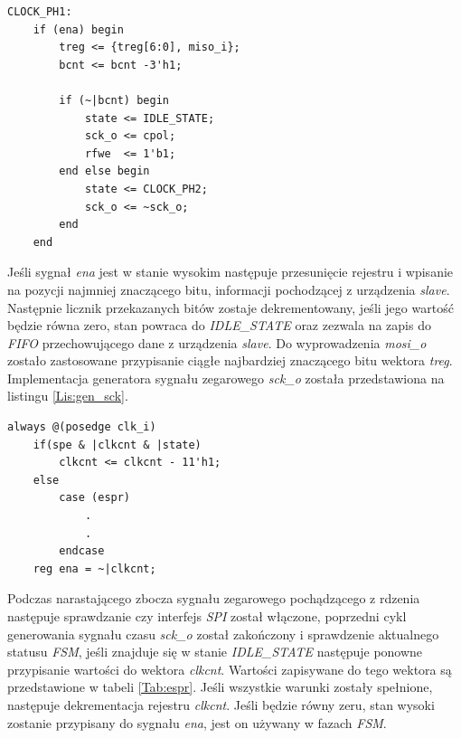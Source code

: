 \documentclass[11pt,a4paper]{article}
\begin{document}
 			 \begin{minipage}{\textwidth}
\begin{scriptsize}
\begin{lstlisting}[label=Lis:spi_clock1,caption=Faza \textit{CLOCK\_PH1}]
CLOCK_PH1:
	if (ena) begin
		treg <= {treg[6:0], miso_i};
		bcnt <= bcnt -3'h1;

		if (~|bcnt) begin
			state <= IDLE_STATE;
			sck_o <= cpol;
			rfwe  <= 1'b1;
		end else begin
			state <= CLOCK_PH2;
			sck_o <= ~sck_o;
		end
	end
\end{lstlisting}
\end{scriptsize}
\end{minipage}
Jeśli sygnał \textit{ena} jest w stanie wysokim następuje przesunięcie rejestru i wpisanie na pozycji najmniej znaczącego bitu, informacji pochodzącej z urządzenia \textit{slave}. Następnie licznik przekazanych bitów zostaje dekrementowany, jeśli jego wartość będzie równa zero, stan powraca do \textit{IDLE\_STATE} oraz zezwala na zapis do \textit{FIFO} przechowującego dane z urządzenia \textit{slave}. Do wyprowadzenia \textit{mosi\_o} zostało zastosowane przypisanie ciągłe najbardziej znaczącego bitu wektora \textit{treg}.\\
Implementacja generatora sygnału zegarowego \textit{sck\_o} została przedstawiona na listingu \ref{Lis:gen_sck}.\\
 			 \begin{minipage}{\textwidth}
\begin{scriptsize}
\begin{lstlisting}[label=Lis:gen_sck,caption=Generowanie sygnału zegarowego]
always @(posedge clk_i)
	if(spe & |clkcnt & |state)
		clkcnt <= clkcnt - 11'h1;
	else
		case (espr) 
			.
			.
		endcase
	reg ena = ~|clkcnt;
\end{lstlisting}
\end{scriptsize}
\end{minipage}
Podczas narastającego zbocza sygnału zegarowego pochądzącego z rdzenia następuje sprawdzanie czy interfejs \textit{SPI} został włączone, poprzedni cykl generowania sygnału czasu \textit{sck\_o} został zakończony i sprawdzenie aktualnego statusu \textit{FSM}, jeśli znajduje się w stanie \textit{IDLE\_STATE} następuje ponowne przypisanie wartości do wektora \textit{clkcnt}. Wartości zapisywane do tego wektora są przedstawione w tabeli \ref{Tab:espr}. Jeśli wszystkie warunki zostały spełnione, następuje dekrementacja rejestru \textit{clkcnt}. Jeśli będzie równy zeru, stan wysoki zostanie przypisany do sygnału \textit{ena}, jest on używany w fazach \textit{FSM}.\\
\end{document}
